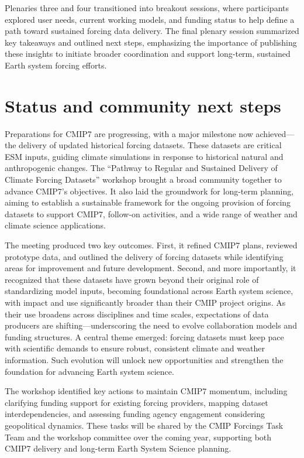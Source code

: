\documentclass{ametsocV6.1}
\begin{document}
Plenaries three and four transitioned into breakout sessions, where participants explored user needs, current working models, and funding status to help define a path toward sustained forcing data delivery. The final plenary session summarized key takeaways and outlined next steps, emphasizing the importance of publishing these insights to initiate broader coordination and support long-term, sustained Earth system forcing efforts.

\section*{Status and community next steps}
Preparations for CMIP7 are progressing, with a major milestone now achieved—the delivery of updated historical forcing datasets. These datasets are critical ESM inputs, guiding climate simulations in response to historical natural and anthropogenic changes. The ``Pathway to Regular and Sustained Delivery of Climate Forcing Datasets'' workshop brought a broad community together to advance CMIP7’s objectives. It also laid the groundwork for long-term planning, aiming to establish a sustainable framework for the ongoing provision of forcing datasets to support CMIP7, follow-on activities, and a wide range of weather and climate science applications.

The meeting produced two key outcomes. First, it refined CMIP7 plans, reviewed prototype data, and outlined the delivery of forcing datasets while identifying areas for improvement and future development. Second, and more importantly, it recognized that these datasets have grown beyond their original role of standardizing model inputs, becoming foundational across Earth system science, with impact and use significantly broader than their CMIP project origins. As their use broadens across disciplines and time scales, expectations of data producers are shifting—underscoring the need to evolve collaboration models and funding structures. A central theme emerged: forcing datasets must keep pace with scientific demands to ensure robust, consistent climate and weather information. Such evolution will unlock new opportunities and strengthen the foundation for advancing Earth system science.

The workshop identified key actions to maintain CMIP7 momentum, including clarifying funding support for existing forcing providers, mapping dataset interdependencies, and assessing funding agency engagement considering geopolitical dynamics. These tasks will be shared by the CMIP Forcings Task Team and the workshop committee over the coming year, supporting both CMIP7 delivery and long-term Earth System Science planning.
\end{document}

